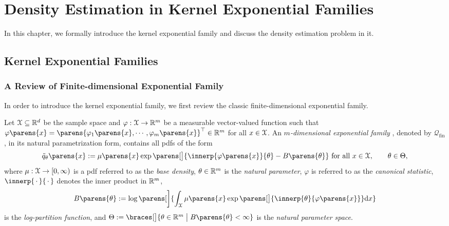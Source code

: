 \chapter{Density Estimation in Kernel Exponential Families}
\label{ch2}

In this chapter, we formally introduce the kernel exponential family and discuss the density estimation problem in it. 

\section{Kernel Exponential Families}

\subsection{A Review of Finite-dimensional Exponential Family}\label{subsection-fin-dim-exp-fam}

In order to introduce the kernel exponential family, we first review the classic finite-dimensional exponential family. 

Let $\mathcal{X} \subseteq \mathbb{R}^d$ be the sample space and $\varphi: \mathcal{X} \to \mathbb{R}^m$ be a measurable vector-valued function such that $\varphi \parens{x} = \parens{\varphi_1 \parens{x}, \cdots, \varphi_m \parens{x}}^\top \in \Real^m$ for all $x \in \mathcal{X}$. An \textit{$m$-dimensional exponential family} \parencite{Brown1986-ef, Barndorff-Nielsen2014-ua}, denoted by $\mathcal{Q}_{\mathrm{fin}}$, in its natural parametrization form, contains all pdfs of the form 
\begin{align}\label{eq-fin-exp-fam}
	\tilde{q}_{\theta} \parens{x} := \mu \parens{x} \exp \parens[\big]{\innerp{\varphi \parens{x}}{\theta} - B \parens{\theta}} \text{ for all } x \in \calX, \qquad \theta \in \Theta, 
\end{align}
where $\mu: \mathcal{X} \to [0, \infty)$ is a pdf referred to as the \textit{base density}, $\theta \in \mathbb{R}^m$ is the \textit{natural parameter}, $\varphi$ is referred to as the \textit{canonical statistic}, $\innerp{\,\cdot\,}{\,\cdot\,}$ denotes the inner product in $\mathbb{R}^m$, 
\begin{align}\label{eq-log-partition-fun-finexpfam}
	B \parens{\theta} := \log \parens[\bigg]{\int_{\calX} \mu \parens{x} \exp \parens[\big]{\innerp{\theta}{\varphi \parens{x}}} \diff x}
\end{align}
is the \textit{log-partition function}, and $\Theta := \braces[\big]{\theta \in \Real^m \bigm| B \parens{\theta} < \infty}$ is the \textit{natural parameter space}. %

